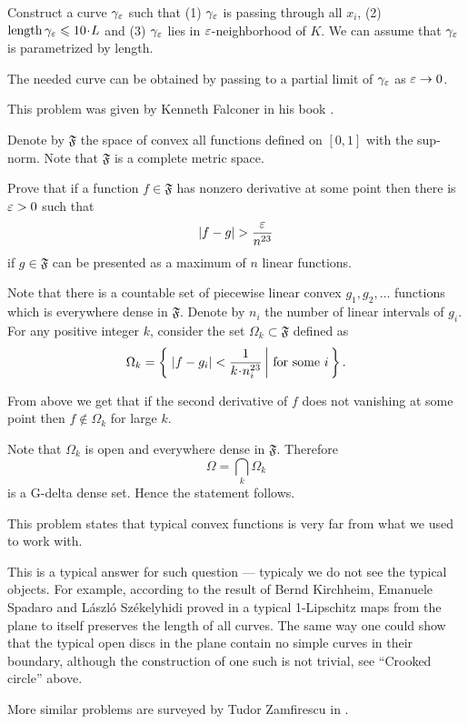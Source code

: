 Construct a curve $\gamma_\varepsilon$ such that (1) $\gamma_\varepsilon$ is passing through all $x_i$, (2) $\length\gamma_\eps\le10\cdot L$ and (3) $\gamma_\varepsilon$ lies in $\varepsilon$-neighborhood of $K$.
We can assume that $\gamma_\varepsilon$ is parametrized by length.

The needed curve can be obtained by passing to 
a partial limit of $\gamma_\varepsilon$
 as $\varepsilon\to 0$. \qeds


This problem was given by Kenneth Falconer
in his book \cite[Exercise 3.5 in][]{falconer}.



Denote by $\mathfrak{F}$ the space of convex all functions defined on $[0,1]$ with the sup-norm.
Note that $\mathfrak{F}$ is a complete metric space.

Prove that if a function $f\in\mathfrak{F}$ has nonzero derivative at some point then there is $\varepsilon>0$ such that
\[|f-g|> \frac{\eps}{n^{23}}\]
if $g\in\mathfrak{F}$  can be presented as a maximum of $n$ linear functions.

Note that there is a countable set of piecewise linear convex $g_1,g_2,\dots$ functions which is everywhere dense in $\mathfrak{F}$.
Denote by $n_i$ the number of linear intervals of $g_i$.
For any positive integer $k$,
consider the set $\Omega_k\subset\mathfrak{F}$ defined as 
\[\Omega_k
=
\set{|f-g_i|<\frac1{k\cdot n_i^{23}}}{\text{for some}\ i}.\]

From above we get that if the second derivative of $f$ does not vanishing at some point then $f\notin\Omega_k$ for large $k$. 

Note that $\Omega_k$ is open and everywhere dense in $\mathfrak{F}$.
Therefore 
\[\Omega=\bigcap_k\Omega_k\]
is a G-delta dense set.
Hence the statement follows.\qeds
  


This problem states that typical convex functions is very far from what we used to work with.

This is a typical answer for such question --- typicaly we do not see the typical objects.
For example, according to the result of 
Bernd Kirchheim, 
Emanuele Spadaro  
and 
L{\'a}szl{\'o} Sz{\'e}kelyhidi proved in \cite{KSS}
a typical 1-Lipschitz maps from the plane to itself preserves the length of all curves.
The same way one could show that the typical open discs in the plane contain no simple curves in their boundary, 
although the construction of one such is not trivial, 
see ``Crooked circle'' above.

More similar problems are surveyed by Tudor Zamfirescu in \cite{zamfirescu}.







